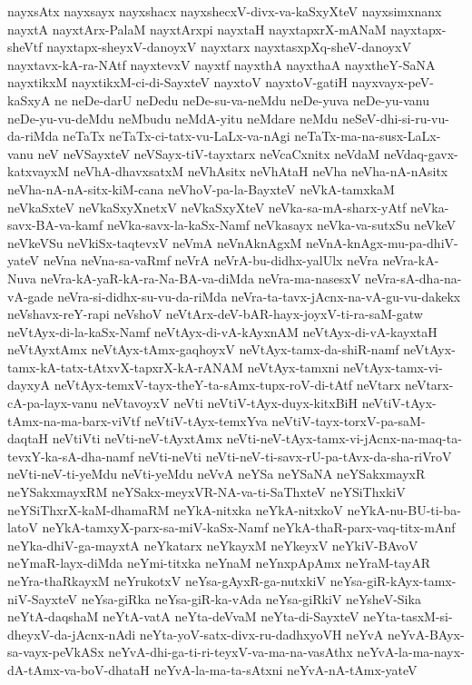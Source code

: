 {nayxsAtx
nayxsayx
nayxshacx
nayxshecxV-divx-va-kaSxyXteV
nayxsimxnanx
nayxtA
nayxtArx-PalaM
nayxtArxpi
nayxtaH
nayxtapxrX-mANaM
nayxtapx-sheVtf
nayxtapx-sheyxV-danoyxV
nayxtarx
nayxtasxpXq-sheV-danoyxV
nayxtavx-kA-ra-NAtf
nayxtevxV
nayxtf
nayxthA
nayxthaA
nayxtheY-SaNA
nayxtikxM
nayxtikxM-ci-di-SayxteV
nayxtoV
nayxtoV-gatiH
nayxvayx-peV-kaSxyA
ne
neDe-darU
neDedu
neDe-su-va-neMdu
neDe-yuva
neDe-yu-vanu
neDe-yu-vu-deMdu
neMbudu
neMdA-yitu
neMdare
neMdu
neSeV-dhi-si-ru-vu-da-riMda
neTaTx
neTaTx-ci-tatx-vu-LaLx-va-nAgi
neTaTx-ma-na-susx-LaLx-vanu
neV
neVSayxteV
neVSayx-tiV-tayxtarx
neVcaCxnitx
neVdaM
neVdaq-gavx-katxvayxM
neVhA-dhavxsatxM
neVhAsitx
neVhAtaH
neVha
neVha-nA-nAsitx
neVha-nA-nA-sitx-kiM-cana
neVhoV-pa-la-BayxteV
neVkA-tamxkaM
neVkaSxteV
neVkaSxyXnetxV
neVkaSxyXteV
neVka-sa-mA-sharx-yAtf
neVka-savx-BA-va-kamf
neVka-savx-la-kaSx-Namf
neVkasayx
neVka-va-sutxSu
neVkeV
neVkeVSu
neVkiSx-taqtevxV
neVmA
neVnAknAgxM
neVnA-knAgx-mu-pa-dhiV-yateV
neVna
neVna-sa-vaRmf
neVrA
neVrA-bu-didhx-yalUlx
neVra
neVra-kA-Nuva
neVra-kA-yaR-kA-ra-Na-BA-va-diMda
neVra-ma-nasesxV
neVra-sA-dha-na-vA-gade
neVra-si-didhx-su-vu-da-riMda
neVra-ta-tavx-jAcnx-na-vA-gu-vu-dakekx
neVshavx-reY-rapi
neVshoV
neVtArx-deV-bAR-hayx-joyxV-ti-ra-saM-gatw
neVtAyx-di-la-kaSx-Namf
neVtAyx-di-vA-kAyxnAM
neVtAyx-di-vA-kayxtaH
neVtAyxtAmx
neVtAyx-tAmx-gaqhoyxV
neVtAyx-tamx-da-shiR-namf
neVtAyx-tamx-kA-tatx-tAtxvX-tapxrX-kA-rANAM
neVtAyx-tamxni
neVtAyx-tamx-vi-dayxyA
neVtAyx-temxV-tayx-theY-ta-sAmx-tupx-roV-di-tAtf
neVtarx
neVtarx-cA-pa-layx-vanu
neVtavoyxV
neVti
neVtiV-tAyx-duyx-kitxBiH
neVtiV-tAyx-tAmx-na-ma-barx-viVtf
neVtiV-tAyx-temxYva
neVtiV-tayx-torxV-pa-saM-daqtaH
neVtiVti
neVti-neV-tAyxtAmx
neVti-neV-tAyx-tamx-vi-jAcnx-na-maq-ta-tevxY-ka-sA-dha-namf
neVti-neVti
neVti-neV-ti-savx-rU-pa-tAvx-da-sha-riVroV
neVti-neV-ti-yeMdu
neVti-yeMdu
neVvA
neYSa
neYSaNA
neYSakxmayxR
neYSakxmayxRM
neYSakx-meyxVR-NA-va-ti-SaThxteV
neYSiThxkiV
neYSiThxrX-kaM-dhamaRM
neYkA-nitxka
neYkA-nitxkoV
neYkA-nu-BU-ti-ba-latoV
neYkA-tamxyX-parx-sa-miV-kaSx-Namf
neYkA-thaR-parx-vaq-titx-mAnf
neYka-dhiV-ga-mayxtA
neYkatarx
neYkayxM
neYkeyxV
neYkiV-BAvoV
neYmaR-layx-diMda
neYmi-titxka
neYnaM
neYnxpApAmx
neYraM-tayAR
neYra-thaRkayxM
neYrukotxV
neYsa-gAyxR-ga-nutxkiV
neYsa-giR-kAyx-tamx-niV-SayxteV
neYsa-giRka
neYsa-giR-ka-vAda
neYsa-giRkiV
neYsheV-Sika
neYtA-daqshaM
neYtA-vatA
neYta-deVvaM
neYta-di-SayxteV
neYta-tasxM-si-dheyxV-da-jAcnx-nAdi
neYta-yoV-satx-divx-ru-dadhxyoVH
neYvA
neYvA-BAyx-sa-vayx-peVkASx
neYvA-dhi-ga-ti-ri-teyxV-va-ma-na-vasAthx
neYvA-la-ma-nayx-dA-tAmx-va-boV-dhataH
neYvA-la-ma-ta-sAtxni
neYvA-nA-tAmx-yateV
}
